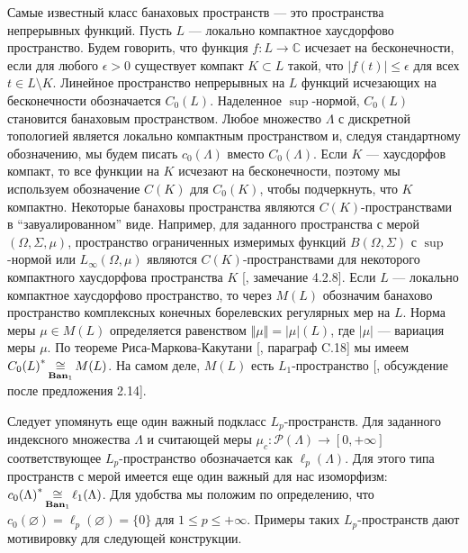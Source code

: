Самые известный класс банаховых пространств --- это пространства непрерывных
функций. Пусть $L$ --- локально компактное хаусдорфово пространство. Будем
говорить, что функция $f:L\to\mathbb{C}$ исчезает на бесконечности, если для
любого $\epsilon>0$ существует компакт $K\subset L$ такой, что
$|f(t)|\leq\epsilon$ для всех $t\in L\setminus K$. Линейное пространство
непрерывных на $L$ функций исчезающих на бесконечности обозначается $C_0(L)$.
Наделенное $\sup$-нормой, $C_0(L)$ становится банаховым пространством. Любое
множество $\Lambda$ с дискретной топологией является локально компактным
пространством и, следуя стандартному обозначению, мы будем писать $c_0(\Lambda)$
вместо $C_0(\Lambda)$. Если $K$ --- хаусдорфов компакт, то все функции на $K$
исчезают на бесконечности, поэтому мы используем обозначение $C(K)$ для
$C_0(K)$, чтобы подчеркнуть, что $K$ компактно. Некоторые банаховы пространства
являются $C(K)$-пространствами в ``завуалированном'' виде. Например, для
заданного пространства с мерой $(\Omega,\Sigma,\mu)$, пространство ограниченных
измеримых функций $B(\Omega,\Sigma)$ с $\sup$-нормой или $L_\infty(\Omega,\mu)$
являются $C(K)$-пространствами для некоторого компактного хаусдорфова
пространства $K$ [\cite{KalAlbTopicsBanSpTh}, замечание 4.2.8]. Если $L$ ---
локально компактное хаусдорфово пространство, то через $M(L)$ обозначим банахово
пространство комплексных конечных борелевских регулярных мер на $L$. Норма меры
$\mu\in M(L)$ определяется равенством $\Vert\mu\Vert=|\mu|(L)$, где $|\mu|$ ---
вариация меры $\mu$. По теореме Риса-Маркова-Какутани
[\cite{ConwACoursInFuncAn}, параграф C.18] мы имеем
${C_0(L)}^*\mathop{\mathbin{\cong}}\limits_{\mathbf{Ban}_1}M(L)$. На самом деле, $M(L)$ есть
$L_1$-пространство [\cite{DalLauSecondDualOfMeasAlg}, обсуждение после
предложения 2.14]. 

Следует упомянуть еще один важный подкласс $L_p$-пространств. Для заданного
индексного множества $\Lambda$ и считающей меры
$\mu_c:\mathcal{P}(\Lambda)\to[0,+\infty]$ соответствующее $L_p$-пространство
обозначается как $\ell_p(\Lambda)$. Для этого типа пространств с мерой имеется
еще один важный для нас изоморфизм:
${c_0(\Lambda)}^*\mathop{\mathbin{\cong}}\limits_{\mathbf{Ban}_1}\ell_1(\Lambda)$. Для удобства мы положим
по определению, что $c_0(\varnothing)=\ell_p(\varnothing)=\{0\}$ для $1\leq
p\leq+\infty$. Примеры таких $L_p$-пространств дают мотивировку для следующей
конструкции.

